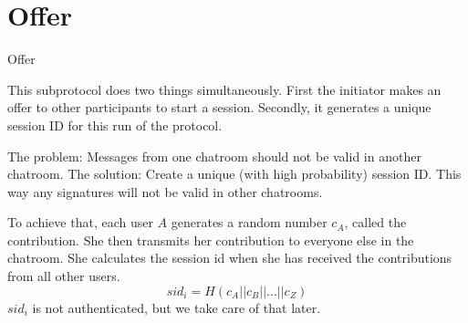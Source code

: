 \section{Offer}
\begin{frame}
\Huge{\centerline{Offer}}
\end{frame}

\begin{frame}
  This subprotocol does two things simultaneously.
  \vfill
  First the initiator makes an offer to other participants to start a session.
  \vfill
  Secondly, it generates a unique session ID for this run of the protocol.
\end{frame}

\begin{frame}
  The problem: Messages from one chatroom should not be valid in another chatroom.
  \vfill
  The solution: Create a unique (with high probability) session ID. This way any signatures will not be valid in other chatrooms.

\end{frame}

\begin{frame}
  To achieve that, each user $A$ generates a random number $c_A$, called the contribution.
  \vfill
  She then transmits her contribution to everyone else in the chatroom.
  \vfill
  She calculates the session id when she has received the contributions from all other users.
  \[
      sid_i = H(c_A || c_B || \dots || c_Z)
  \]
  \vfill
  $sid_i$ is not authenticated, but we take care of that later.
\end{frame}
